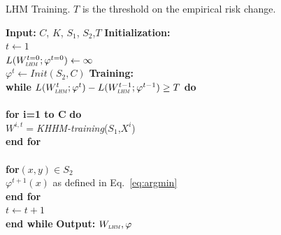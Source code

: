 \documentclass[twoside,11pt]{article}
\newcommand{\wl}{W_{\textsc{\textsc{\relsize{-2}{\textsl{LHM}}}}}}
\begin{document}
\begin{algorithm}
\caption{LHM Training. $T$ is the threshold on the empirical risk change.}
\label{alg:lhm}
\begin{algorithmic}
\STATE\textbf{Input: }$C$, $K$, $S_1$, $S_2$,$T$
\STATE \textbf{Initialization:} \\\hspace{0.5cm}
$t \gets 1$ \\\hspace{0.5cm}
$L(\wl^{t=0};\varphi^{t=0}) \gets \infty$ \\\hspace{0.5cm}
$\varphi^t \gets Init(S_2,C)$  
\STATE
\STATE \textbf{Training:} \\\hspace{0.5cm}
\textbf{while }$L(\wl^t;\varphi^t) - L(\wl^{t-1};\varphi^{t-1}) \ge T$ \textbf{do}\\\hspace{1cm}
\\\hspace{1cm}
\textbf{for i=1 to C} \textbf{do}\\\hspace{1.5cm}
$W^{i,t}=$\emph{KHHM-training}($S_1$,$X^i$) \\\hspace{1cm}
\textbf{end for}\\\hspace{1cm}
\\\hspace{1cm}
\textbf{for{$(x,y)\in S_2$}}\\\hspace{1.5cm}
$\varphi^{t+1}(x)$ as defined in Eq.~\ref{eq:argmin}\\\hspace{1cm}
\textbf{end for}\\\hspace{1cm}
$ t \gets t+1 $ \\\hspace{0.5cm}
\textbf{end while}
\STATE\textbf{Output: }$\wl,\varphi$
\end{algorithmic}
\end{algorithm}
\end{document}
